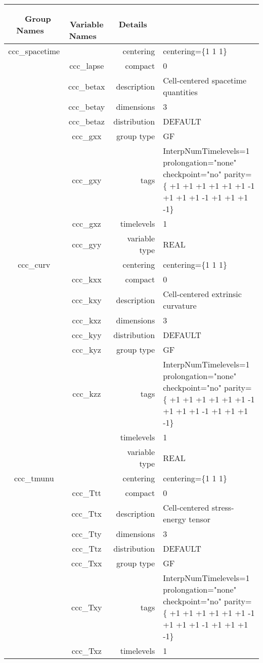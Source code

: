 \begin{tabular*}{150mm}{|c|c@{\extracolsep{\fill}}|rl|} \hline 
~ {\bf Group Names} ~ & ~ {\bf Variable Names} ~  &{\bf Details} ~ & ~\\ 
\hline 
ccc\_spacetime &  & centering & centering=\{1 1 1\} \\ 
 & ccc\_lapse & compact & 0 \\ 
 & ccc\_betax & description & Cell-centered spacetime quantities \\ 
 & ccc\_betay & dimensions & 3 \\ 
 & ccc\_betaz & distribution & DEFAULT \\ 
 & ccc\_gxx & group type & GF \\ 
 & ccc\_gxy & tags & InterpNumTimelevels=1 prolongation="none" checkpoint="no" parity=\{ +1 +1 +1  +1 +1 +1  -1 +1 +1  +1 -1 +1  +1 +1 -1\} \\ 
 & ccc\_gxz & timelevels & 1 \\ 
 & ccc\_gyy & variable type & REAL \\ 
\hline 
ccc\_curv &  & centering & centering=\{1 1 1\} \\ 
 & ccc\_kxx & compact & 0 \\ 
 & ccc\_kxy & description & Cell-centered extrinsic curvature \\ 
 & ccc\_kxz & dimensions & 3 \\ 
 & ccc\_kyy & distribution & DEFAULT \\ 
 & ccc\_kyz & group type & GF \\ 
 & ccc\_kzz & tags & InterpNumTimelevels=1 prolongation="none" checkpoint="no" parity=\{ +1 +1 +1  +1 +1 +1  -1 +1 +1  +1 -1 +1  +1 +1 -1\} \\ 
 &  & timelevels & 1 \\ 
 &  & variable type & REAL \\ 
\hline 
ccc\_tmunu &  & centering & centering=\{1 1 1\} \\ 
 & ccc\_Ttt & compact & 0 \\ 
 & ccc\_Ttx & description & Cell-centered stress-energy tensor \\ 
 & ccc\_Tty & dimensions & 3 \\ 
 & ccc\_Ttz & distribution & DEFAULT \\ 
 & ccc\_Txx & group type & GF \\ 
 & ccc\_Txy & tags & InterpNumTimelevels=1 prolongation="none" checkpoint="no" parity=\{ +1 +1 +1  +1 +1 +1  -1 +1 +1  +1 -1 +1  +1 +1 -1\} \\ 
 & ccc\_Txz & timelevels & 1 \\ 

\end{tabular*}
